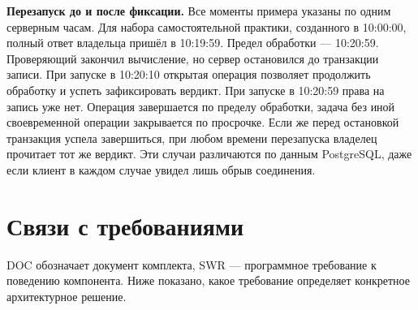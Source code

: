 \documentclass[12pt,a4paper]{article}
\begin{document}
\textbf{Перезапуск до и после фиксации.} Все моменты примера указаны по одним серверным часам. Для набора самостоятельной практики, созданного в 10:00:00, полный ответ владельца пришёл в 10:19:59. Предел обработки --- 10:20:59. Проверяющий закончил вычисление, но сервер остановился до транзакции записи. При запуске в 10:20:10 открытая операция позволяет продолжить обработку и успеть зафиксировать вердикт. При запуске в 10:20:59 права на запись уже нет. Операция завершается по пределу обработки, задача без иной своевременной операции закрывается по просрочке. Если же перед остановкой транзакция успела завершиться, при любом времени перезапуска владелец прочитает тот же вердикт. Эти случаи различаются по данным PostgreSQL, даже если клиент в каждом случае увидел лишь обрыв соединения.

\section{Связи с требованиями}\label{7-ux441ux432ux44fux437ux438-ux441-ux442ux440ux435ux431ux43eux432ux430ux43dux438ux44fux43cux438}

\hypertarget{7-связи-с-требованиями}{}

DOC обозначает документ комплекта, SWR --- программное требование к поведению компонента. Ниже показано, какое требование определяет конкретное архитектурное решение.
\end{document}
